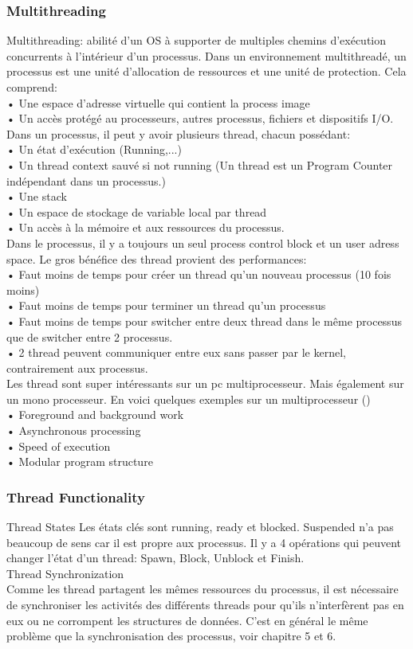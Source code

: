\subsubsection{Multithreading}
Multithreading: abilité d'un OS à supporter de multiples chemins d'exécution concurrents à l'intérieur d'un processus. Dans un environnement multithreadé, un processus est une unité d'allocation de ressources et une unité de protection. Cela comprend:\\
• Une espace d'adresse virtuelle qui contient la process image\\
• Un accès protégé au processeurs, autres processus, fichiers et dispositifs I/O.\\
Dans un processus, il peut y avoir plusieurs thread, chacun possédant:\\
• Un état d'exécution (Running,...)\\
• Un thread context sauvé si not running (Un thread est un Program Counter\\
indépendant dans un processus.) \\
• Une stack\\
• Un espace de stockage de variable local par thread\\
• Un accès à la mémoire et aux ressources du processus.\\
Dans le processus, il y a toujours un seul process control block et un user adress space. Le gros bénéfice des thread provient des performances:\\
• Faut moins de temps pour créer un thread qu'un nouveau processus (10 fois moins)\\
• Faut moins de temps pour terminer un thread qu'un processus\\
• Faut moins de temps pour switcher entre deux thread dans le même processus que de switcher entre 2 processus.\\
• 2 thread peuvent communiquer entre eux sans passer par le kernel, contrairement aux processus.\\
Les thread sont super intéressants sur un pc multiprocesseur. Mais également sur un mono processeur. En voici quelques exemples sur un multiprocesseur (\cite[p.~181]{stallings})\\
• Foreground and background work \\
• Asynchronous processing\\
• Speed of execution\\
• Modular program structure\\
\subsubsection{Thread Functionality}
Thread States
Les états clés sont running, ready et blocked. Suspended n'a pas beaucoup de sens car il est propre aux processus. Il y a 4 opérations qui peuvent changer l'état d'un thread: Spawn, Block, Unblock et Finish.\\
Thread Synchronization\\
Comme les thread partagent les mêmes ressources du processus, il est nécessaire de synchroniser les activités des différents threads pour qu'ils n'interfèrent pas en eux ou ne corrompent les structures de données. C'est en général le même problème que la synchronisation des processus, voir chapitre 5 et 6.
